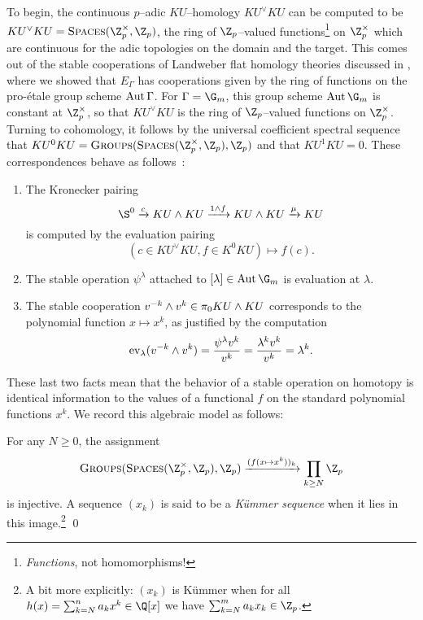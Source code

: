 To begin, the continuous \(p\)--adic \(KU\)--homology \(KU^\vee KU\) can be computed to be \(KU^\vee KU = \CatOf{Spaces}(\Z_p^\times, \Z_p)\), the ring of \(\Z_p\)--valued functions\footnote{\emph{Functions}, not homomorphisms!} on \(\Z_p^\times\) which are continuous for the adic topologies on the domain and the target.  This comes out of the stable cooperations of Landweber flat homology theories discussed in , where we showed that \(E_\Gamma\) has cooperations given by the ring of functions on the pro-\'etale group scheme \(\operatorname{Aut} \Gamma\).  For \(\Gamma = \G_m\), this group scheme \(\Aut \G_m\) is constant at \(\Z_p^\times\), so that \(KU^\vee KU\) is the ring of \(\Z_p\)--valued functions on \(\Z_p^\times\).  Turning to cohomology, it follows by the universal coefficient spectral sequence that \(KU^0 KU = \CatOf{Groups}(\CatOf{Spaces}(\Z_p^\times, \Z_p), \Z_p)\) and that \(KU^1 KU = 0\).  These correspondences behave as follows~\cite{AHRMoments}:
\begin{enumerate}
    \item The Kronecker pairing \[\S^0 \xrightarrow{c} KU \sm KU \xrightarrow{1 \sm f} KU \sm KU \xrightarrow{\mu} KU\] is computed by the evaluation pairing \[(c \in KU^\vee KU, f \in K^0 KU) \mapsto f(c).\]
    \item The stable operation \(\psi^\lambda\) attached to \([\lambda] \in \Aut \G_m\) is evaluation at \(\lambda\).
    \item The stable cooperation \(v^{-k} \wedge v^k \in \pi_0 KU \wedge KU\) corresponds to the polynomial function \(x \mapsto x^k\), as justified by the computation \[\operatorname{ev}_{\lambda}(v^{-k} \wedge v^k) = \frac{\psi^\lambda v^k}{v^k} = \frac{\lambda^k v^k}{v^k} = \lambda^k.\]
\end{enumerate}

\noindent These last two facts mean that the behavior of a stable operation on homotopy is identical information to the values of a functional \(f\) on the standard polynomial functions \(x^k\).  We record this algebraic model as follows:
\begin{lemma}\label{KOKummerLemma}
For any \(N \ge 0\), the assignment \[\CatOf{Groups}(\CatOf{Spaces}(\Z_p^\times, \Z_p), \Z_p) \xrightarrow{(f(x \mapsto x^k))_k} \prod_{k \ge N} \Z_p\] is injective.  A sequence \((x_k)\) is said to be a \textit{K\"ummer sequence} when it lies in this image.\footnote{A bit more explicitly: \((x_k)\) is K\"ummer when for all \(h(x) = \sum_{k=N}^n a_k x^k \in \Q[x]\) we have \(\sum_{k=N}^m a_k x_k \in \Z_p\).} \qed
\end{lemma}

